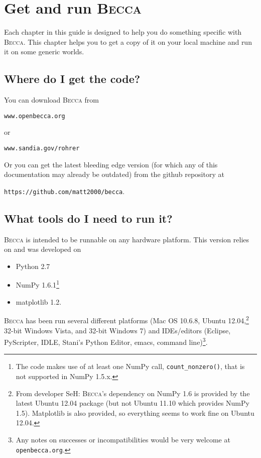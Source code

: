 \chapter{Get and run \textsc{Becca}}

Each chapter in this guide is designed to help you do something specific with \textsc{Becca}. This chapter helps you to get a copy of it on your local machine and run it on some generic worlds.

\section{Where do I get the code?}

You can download \textsc{Becca} from 

\texttt{www.openbecca.org} 

or 

\texttt{www.sandia.gov/rohrer} 

Or you can get the latest bleeding edge version (for which any of this documentation may already be outdated) from the github repository at

\texttt{https://github.com/matt2000/becca}.

\section{What tools do I need to run it?}

\textsc{Becca} is intended to be runnable on any hardware platform. This version relies on and was developed on 
\begin{itemize}
\item{Python 2.7}
\item{NumPy 1.6.1\footnote{The code makes use of at least one NumPy call, \texttt{count\_nonzero()}, that is not supported in NumPy 1.5.x.} }
\item{matplotlib 1.2}.
\end{itemize}
\textsc{Becca} has been run several different platforms (Mac OS 10.6.8, Ubuntu 12.04,\footnote{From developer SeH: \textsc{Becca}'s dependency on NumPy 1.6 is provided by the latest Ubuntu 12.04 package (but not Ubuntu 11.10 which provides NumPy 1.5).  Matplotlib is also provided, so everything seems to work fine on Ubuntu 12.04.} 32-bit Windows Vista, and 32-bit Windows 7) and IDEs/editors (Eclipse, PyScripter, IDLE, Stani's Python Editor, emacs, command line)\footnote{Any notes on successes or incompatibilities would be very welcome at \texttt{openbecca.org}.}. 


